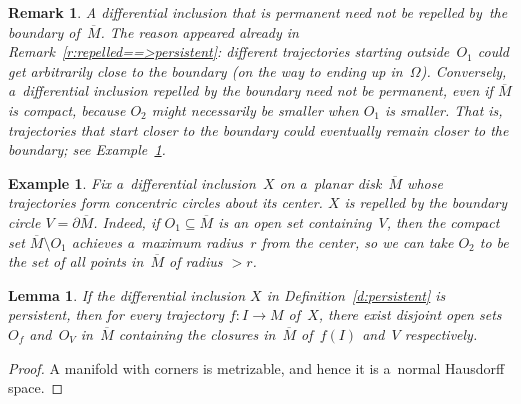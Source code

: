 \documentclass[pdftex]{sigma}
\newtheorem{Lemma}[Theorem]{Lemma}
\newtheorem{Example}[Theorem]{Example}
\newtheorem{Remark}[Theorem]{Remark}
\newcommand\ol[1]{{\overline {#1}}}
\begin{document}
\begin{Remark}
\label{r:permanent}
A dif\/ferential inclusion that is permanent need not be repelled by~the boundary of~$\ol M$.
The reason appeared already in Remark~\ref{r:repelled==>persistent}: dif\/ferent trajectories starting outside~$O_1$
could get arbitrarily close to the boundary (on the way to ending up in~$\Omega$).
Conversely, a~dif\/ferential inclusion repelled by the boundary need not be permanent, even if $\ol M$ is compact,
because $O_2$ might necessarily be smaller when $O_1$ is smaller.
That is, trajectories that start closer to the boundary could eventually remain closer to the boundary; see
Example~\ref{e:repelled}.
\end{Remark}
\begin{Example}
\label{e:repelled}
Fix a~dif\/ferential inclusion~$X$ on a~planar disk~$\ol M$ whose trajectories form concentric circles about its center.
$X$ is repelled by the boundary circle $V=\partial\ol M$.
Indeed, if $O_1\subseteq\ol M$ is an open set containing~$V$, then the compact set $\ol M\setminus O_1$ achieves
a~maximum radius~$r$ from the center, so we can take $O_2$ to be the set of all points in~$\ol M$ of radius $>r$.
\end{Example}
\begin{Lemma}
\label{l:normal}
If the differential inclusion $X$ in Definition~{\rm \ref{d:persistent}} is persistent, then for every trajec\-tory $f:I\to
M$ of~$X$, there exist disjoint open sets~$O_f$ and~$O_V$ in~$\ol M$ containing the closures in~$\ol M$ of~$f(I)$
and~$V$ respectively.
\end{Lemma}

\begin{proof}
A manifold with corners is metrizable, and hence it is a~normal Hausdorf\/f space.
\end{proof}
\end{document}
